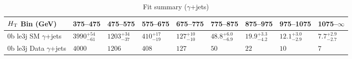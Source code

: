 \documentclass[8pt]{article}
\def\scalht{\mbox{$H_{\rm{T}}$}\xspace}
\newcommand\T{\rule{0pt}{2.6ex}}
\begin{document}
\begin{table}[ht!]
\caption{Fit summary ($\gamma$+jets)}
\label{tab:ensemble-summary}
\centering
\begin{tabular}{ lllllllll }

\hline
\scalht Bin (GeV)       & 375--475                       & 475--575                       & 575--675                       & 675--775                       & 775--875                       & 875--975                       & 975--1075                      & 1075--$\infty$                 \\ [1.000000ex]
\hline
0b le3j SM $\gamma$+jets\T & $3990^{+54}_{-61}$             & $1203^{+34}_{-37}$             & $410^{+17}_{-19}$              & $127^{+10}_{-10}$              & $48.8^{+6.0}_{-6.9}$           & $19.9^{+3.3}_{-4.2}$           & $12.1^{+3.0}_{-2.9}$           & $7.7^{+2.9}_{-2.7}$            \\ 
0b le3j Data $\gamma$+jets\T & $4000$                         & $1206$                         & $408$                          & $127$                          & $50$                           & $22$                           & $10$                           & $7$                            \\ 
\hline

\end{tabular}
\end{table}
\end{document}
